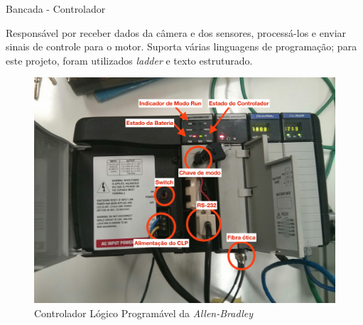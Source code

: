 \documentclass[10pt]{beamer}
\begin{document}
\begin{frame}[fragile]{Bancada - Controlador}
\begin{block}{}
Responsável por receber dados da câmera e dos sensores, processá-los e enviar sinais de controle para o motor. Suporta várias linguagens de programação; para este projeto, foram utilizados \textit{ladder} e texto estruturado.
\end{block}
\begin{figure}[!ht]
	\centering
	\includegraphics[width=.5\linewidth]{figures/fundamentos/CLP}
	\caption{Controlador Lógico Programável da \textit{Allen-Bradley}}
	\label{clpfig}
\end{figure}
\end{frame}
\end{document}
